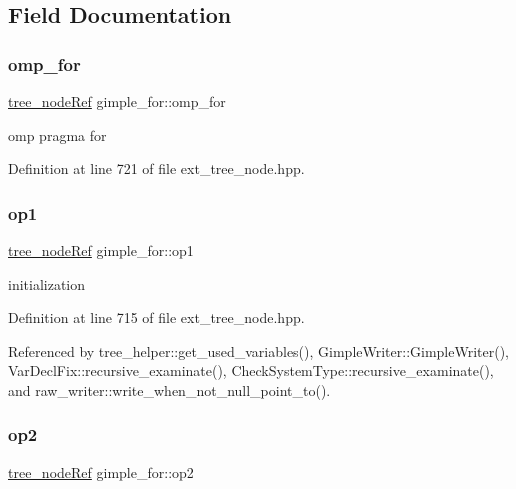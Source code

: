 \subsection{Field Documentation}
\mbox{\label{structgimple__for_a20199fdf6afef9799e2b01168d4b066a}} 
\subsubsection{\texorpdfstring{omp\+\_\+for}{omp\_for}}
{\footnotesize\ttfamily \hyperlink{tree__node_8hpp_a6ee377554d1c4871ad66a337eaa67fd5}{tree\+\_\+node\+Ref} gimple\+\_\+for\+::omp\+\_\+for}



omp pragma for 



Definition at line 721 of file ext\+\_\+tree\+\_\+node.\+hpp.

\mbox{\label{structgimple__for_ab90825b9ceb6a03f2f4846ed5fdc6b4c}} 
\subsubsection{\texorpdfstring{op1}{op1}}
{\footnotesize\ttfamily \hyperlink{tree__node_8hpp_a6ee377554d1c4871ad66a337eaa67fd5}{tree\+\_\+node\+Ref} gimple\+\_\+for\+::op1}



initialization 



Definition at line 715 of file ext\+\_\+tree\+\_\+node.\+hpp.



Referenced by tree\+\_\+helper\+::get\+\_\+used\+\_\+variables(), Gimple\+Writer\+::\+Gimple\+Writer(), Var\+Decl\+Fix\+::recursive\+\_\+examinate(), Check\+System\+Type\+::recursive\+\_\+examinate(), and raw\+\_\+writer\+::write\+\_\+when\+\_\+not\+\_\+null\+\_\+point\+\_\+to().

\mbox{\label{structgimple__for_ae95e121038b3f0a03a4558fad32900c8}} 
\subsubsection{\texorpdfstring{op2}{op2}}
{\footnotesize\ttfamily \hyperlink{tree__node_8hpp_a6ee377554d1c4871ad66a337eaa67fd5}{tree\+\_\+node\+Ref} gimple\+\_\+for\+::op2}



